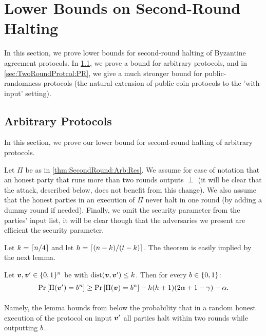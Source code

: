 \newcommand{\DF}{D_\F}
\newcommand{\SDF}{\Supp(D_\F)}


\section{Lower Bounds on Second-Round Halting}\label{sec:SecondRound}
In this section, we prove lower bounds for second-round halting of Byzantine agreement protocols. In \cref{sec:TwoRoundProtcol:Arbitrary}, we prove a bound for arbitrary protocols, and in \cref{sec:TwoRoundProtcol:PR}, we give a much stronger bound for public-randomness protocols (the natural extension of public-coin protocols to the 'with-input' setting).

\subsection{Arbitrary Protocols}\label{sec:TwoRoundProtcol:Arbitrary}
In this section, we prove  our lower bound for  second-round halting of arbitrary protocols.


\begin{theorem}\label{thm:SecondRound:Arb:Res}
\ThmSecondRoundArb
\end{theorem}

Let $\Pi$ be as in \cref{thm:SecondRound:Arb:Res}. We assume for ease of notation that an honest party that runs more than two rounds outputs $\perp$ (it will be clear that the attack, described  below, does not benefit from this change). We also assume \wlg that the honest parties in an execution of $\Pi$ never halt in one round (by adding a dummy round if needed). Finally, we omit the security parameter from the parties' input list, it will be clear though that the adversaries we present are efficient \wrt the security parameter.

Let $k =\left\lceil n/4 \right\rceil$ and let $h = \left\lceil (n-k)/(t-k) \right\rceil$. The theorem is easily implied by the next lemma.

\begin{lemma}\label{lemma:SecondRound:Arb}
	Let ${ \boldsymbol{v}},{ \boldsymbol{v}}' \in {\{0,1\}^n}$ be with $\mathrm{dist}({ \boldsymbol{v}},{ \boldsymbol{v}}') \le k$. Then for every $b\in \{0,1\}$:
\[
\Pr_{}\left[\Pi({ \boldsymbol{v}}') = b^n\right] \ge \Pr_{}\left[\Pi({ \boldsymbol{v}}) = b^n\right] - h(h+1)(2\alpha + 1-\gamma) - \alpha.
\]
\end{lemma}
Namely, the lemma bounds from below the probability that in a random honest execution of the protocol on input ${ \boldsymbol{v}}'$ all parties halt within two rounds while outputting $b$.


